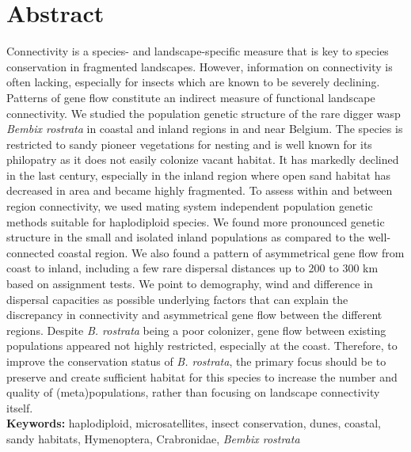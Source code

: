 \documentclass[10pt, twoside]{book} %
\begin{document}
	\section{Abstract}
	Connectivity is a species- and landscape-specific measure that is key to species conservation in fragmented landscapes. However, information on connectivity is often lacking, especially for insects which are known to be severely declining. Patterns of gene flow constitute an indirect measure of functional landscape connectivity. We studied the population genetic structure of the rare digger wasp \textit{Bembix rostrata} in coastal and inland regions in and near Belgium. The species is restricted to sandy pioneer vegetations for nesting and is well known for its philopatry as it does not easily colonize vacant habitat. It has markedly declined in the last century, especially in the inland region where open sand habitat has decreased in area and became highly fragmented. To assess within and between region connectivity, we used mating system independent population genetic methods suitable for haplodiploid species. We found more pronounced genetic structure in the small and isolated inland populations as compared to the well-connected coastal region. We also found a pattern of asymmetrical gene flow from coast to inland, including a few rare dispersal distances up to 200 to 300 km based on assignment tests. We point to demography, wind and difference in dispersal capacities as possible underlying factors that can explain the discrepancy in connectivity and asymmetrical gene flow between the different regions. Despite \textit{B. rostrata} being a poor colonizer, gene flow between existing populations appeared not highly restricted, especially at the coast. Therefore, to improve the conservation status of \textit{B. rostrata}, the primary focus should be to preserve and create sufficient habitat for this species to increase the number and quality of (meta)populations, rather than focusing on landscape connectivity itself.\\
	
	\vspace*{\fill}		
	\noindent \textbf{Keywords:} haplodiploid, microsatellites, insect conservation, dunes, coastal, sandy habitats, Hymenoptera, Crabronidae, \textit{Bembix rostrata}
	\clearpage
	
\end{document}
